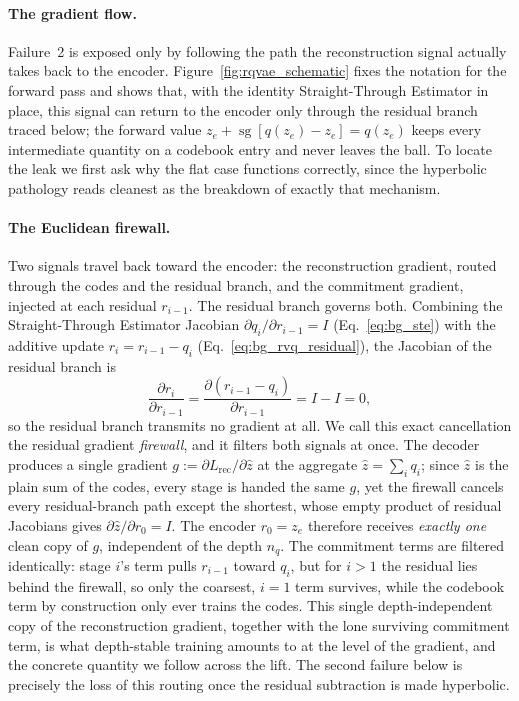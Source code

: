 \documentclass[12pt]{report}
\begin{document}
\paragraph{The gradient flow.}
Failure~2 is exposed only by following the path the reconstruction signal actually takes back to the encoder. Figure~\ref{fig:rqvae_schematic} fixes the notation for the forward pass and shows that, with the identity Straight-Through Estimator in place, this signal can return to the encoder only through the residual branch traced below; the forward value $z_e+\operatorname{sg}[q(z_e)-z_e]=q(z_e)$ keeps every intermediate quantity on a codebook entry and never leaves the ball. To locate the leak we first ask why the flat case functions correctly, since the hyperbolic pathology reads cleanest as the breakdown of exactly that mechanism.

\paragraph{The Euclidean firewall.}
Two signals travel back toward the encoder: the reconstruction gradient, routed through the codes and the residual branch, and the commitment gradient, injected at each residual $r_{i-1}$. The residual branch governs both. Combining the Straight-Through Estimator Jacobian $\partial q_i/\partial r_{i-1}=I$ (Eq.~\ref{eq:bg_ste}) with the additive update $r_i = r_{i-1}-q_i$ (Eq.~\ref{eq:bg_rvq_residual}), the Jacobian of the residual branch is
\begin{equation}
    \label{eq:firewall}
    \frac{\partial r_i}{\partial r_{i-1}}
    = \frac{\partial (r_{i-1} - q_i)}{\partial r_{i-1}}
    = I - I = 0,
\end{equation}
so the residual branch transmits no gradient at all. We call this exact cancellation the residual gradient \emph{firewall}, and it filters both signals at once. The decoder produces a single gradient $g := \partial L_{\text{rec}}/\partial\hat z$ at the aggregate $\hat z=\sum_i q_i$; since $\hat z$ is the plain sum of the codes, every stage is handed the same $g$, yet the firewall cancels every residual-branch path except the shortest, whose empty product of residual Jacobians gives $\partial\hat z/\partial r_0 = I$. The encoder $r_0=z_e$ therefore receives \emph{exactly one} clean copy of $g$, independent of the depth $n_q$. The commitment terms are filtered identically: stage $i$'s term pulls $r_{i-1}$ toward $q_i$, but for $i>1$ the residual lies behind the firewall, so only the coarsest, $i=1$ term survives, while the codebook term by construction only ever trains the codes. This single depth-independent copy of the reconstruction gradient, together with the lone surviving commitment term, is what depth-stable training amounts to at the level of the gradient, and the concrete quantity we follow across the lift. The second failure below is precisely the loss of this routing once the residual subtraction is made hyperbolic.
\end{document}

